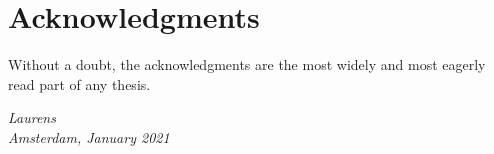 \chapter*{Acknowledgments}

Without a doubt, the acknowledgments are the most widely and most
eagerly read part of any thesis.

\begin{flushright}
{\makeatletter\itshape
    Laurens \\
    Amsterdam, January 2021
\makeatother}
\end{flushright}


